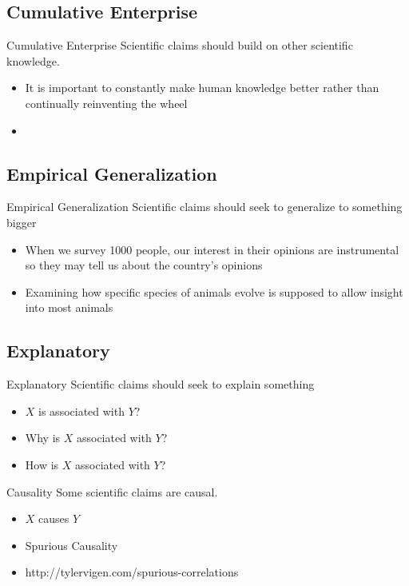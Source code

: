\documentclass{beamer}
\begin{document}
\subsection{Cumulative Enterprise}
\begin{frame}{Cumulative Enterprise}
Scientific claims should build on other scientific knowledge.
\begin{itemize}
\item It is important to constantly make human knowledge better rather than continually reinventing the wheel
\item \href{http://matt.might.net/articles/phd-school-in-pictures/}{}
\end{itemize}

\end{frame}
\subsection{Empirical Generalization}
\begin{frame}{Empirical Generalization}
Scientific claims should seek to generalize to something bigger
\begin{itemize}
\item When we survey 1000 people, our interest in their opinions are instrumental so they may tell us about the country's opinions
\item Examining how specific species of animals evolve is supposed to allow insight into most animals
\end{itemize}
\end{frame}
\subsection{Explanatory}

\begin{frame}{Explanatory}
Scientific claims should seek to explain something
\begin{itemize}
\item $X$ is associated with $Y$?
\item Why is $X$ associated with $Y$?
\item How is $X$ associated with $Y$?
\end{itemize}
\end{frame}

\begin{frame}{Causality}
Some scientific claims are causal.
\begin{itemize}
\item $X$ causes $Y$
\item Spurious Causality
\item http://tylervigen.com/spurious-correlations

\end{itemize}
\end{frame}
\end{document}
